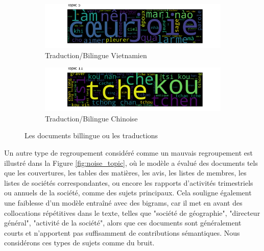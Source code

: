 \begin{figure}[h]
     \centering
     \begin{subfigure}[b]{.9\textwidth}
         \centering
         \includegraphics[width=\textwidth]{img/wordcloud model ngram 200 topic 5 .png}
         \caption{Traduction/Bilingue Vietnamien}
         \label{fig:tp12_5}
     \end{subfigure}
     \hfill
     \begin{subfigure}[b]{.9\textwidth}
         \centering
         \includegraphics[width=\textwidth]{img/wordcloud model ngram 200 topic 11 .png}
         \caption{Traduction/Bilingue Chinoise}
         \label{fig:tp12_11}
     \end{subfigure}
     \hfill
        \caption{Les documents billingue ou les traductions}
        \label{fig:vie_chn}
\end{figure}

Un autre type de regroupement considéré comme un mauvais regroupement est illustré dans la Figure \ref{fig:noise_topic}, où le modèle a évalué des documents tels que les couvertures, les tables des matières, les avis, les listes de membres, les listes de sociétés correspondantes, ou encore les rapports d'activités trimestriels ou annuels de la société, comme des sujets principaux. Cela souligne également une faiblesse d'un modèle entraîné avec des bigrams, car il met en avant des collocations répétitives dans le texte, telles que "société de géographie", "directeur général", "activité de la société", alors que ces documents sont généralement courts et n'apportent pas suffisamment de contributions sémantiques. Nous considérons ces types de sujets comme du bruit.

